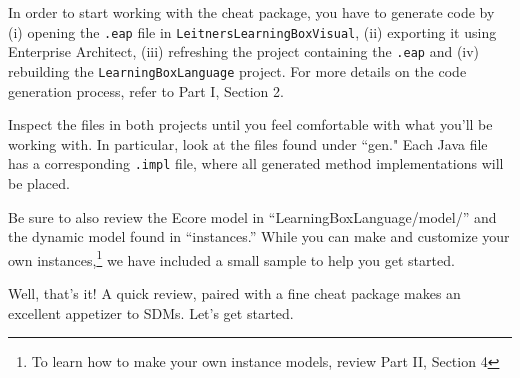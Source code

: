 %
%
%

\begin{stepbystep}
	
\item In order to start working with the cheat package, you have to generate code by (i) opening the \texttt{.eap} file in \texttt{LeitnersLearningBoxVisual}, (ii) exporting it using Enterprise Architect, (iii) refreshing the project containing the \texttt{.eap} and (iv) rebuilding the  \texttt{LearningBoxLanguage} project. For more details on the code generation process, refer to Part I, Section 2.

\item Inspect the files in both projects until you feel comfortable with what you'll be working with. In particular, look at the files
found under ``gen." Each Java file has a corresponding \texttt{.impl} file, where all generated method implementations will be placed.

\item Be sure to also review the Ecore model in ``LearningBoxLanguage/model/'' and the dynamic model found in ``instances.'' While
you can make and customize your own instances,\footnote{To learn how to make your own instance models, review Part II, Section 4} we have included a small
sample to help you get started.

\end{stepbystep}

Well, that's it! A quick review, paired with a fine cheat package makes an excellent appetizer to SDMs. Let's get started.